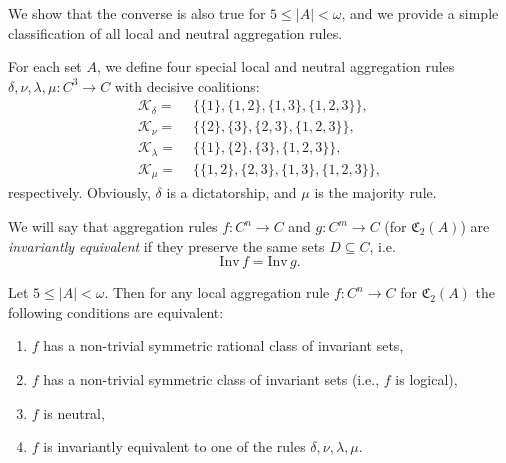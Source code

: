 \documentclass[graybox]{SNmult}
\theoremstyle{definition}
\begin{document}
We show that the converse is also true for $5\leq |A|<\omega$, and we provide a simple classification of all local and neutral aggregation rules.
\par For each set $A$, we define four special local and neutral aggregation rules $\delta, \nu, \lambda, \mu: C^3\to C$ with decisive coalitions:
\begin{align*}
	\mathscr K_\delta=&\,\,\{\{1\}, \{1,2\}, \{1,3\}, \{1,2,3\}\},\\
	\mathscr K_\nu=&\,\,\{\{2\}, \{3\}, \{2,3\}, \{1,2,3\}\},\\
	\mathscr K_\lambda=&\,\,\{\{1\}, \{2\}, \{3\}, \{1,2,3\}\},\\
	\mathscr K_\mu=&\,\,\{\{1,2\}, \{2, 3\}, \{1,3\}, \{1,2,3\}\},
\end{align*}
respectively.  Obviously, $\delta$ is a dictatorship, and $\mu$ is the majority rule.
\begin{definition}
	We will say that aggregation rules $f:C^n\to C$ and $g: C^m\to C$ (for $\mathfrak C_2(A)$) are \textit{invariantly equivalent} if they preserve the same sets $D\subseteq C$, i.e.
	$$
	\mathrm{Inv}\, f=\mathrm{Inv}\, g.
	$$
\end{definition}
\begin{theorem}\label{Th1}
	Let $5\leq |A|<\omega$. Then for any local aggregation rule $f: C^n\to C$ for $\mathfrak C_2(A)$ the following conditions are equivalent:
	\begin{enumerate}
		\item\label{Th1Item1} $f$ has a non-trivial symmetric rational class of invariant sets,
		\item\label{Th1Item2} $f$ has a non-trivial symmetric class of invariant sets (i.e., $f$ is logical),
		\item\label{Th1Item3} $f$ is neutral,
		\item\label{Th1Item4} $f$ is invariantly equivalent to one of the rules $\delta, \nu, \lambda, \mu$.
	\end{enumerate}
\end{theorem}
\end{document}
